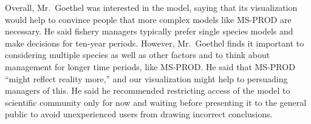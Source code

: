 Overall, Mr.\ Goethel was interested in the model, saying that its visualization would help to convince people that more complex models like MS-PROD are necessary.  He said fishery managers typically prefer single species models and make decisions for ten-year periods.  However, Mr.\ Goethel finds it important to considering multiple species as well as other factors and to think about management for longer time periods, like MS-PROD.  He said that MS-PROD ``might reflect reality more,'' and our visualization might help to persuading managers of this.  He said he recommended restricting access of the model to scientific community only for now and waiting before presenting it to the general public to avoid unexperienced users from drawing incorrect conclusions.
